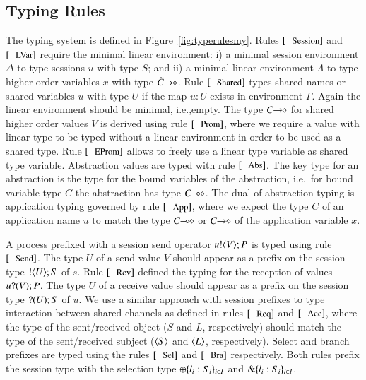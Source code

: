 

\subsection{Typing Rules}



The typing system is defined in Figure~\ref{fig:typerulesmy}.
Rules $\trule{Session}$ and $\trule{LVar}$ require
the minimal linear environment: i) a minimal session environment
$\Delta$ to type sessions $u$ with type $S$; and ii)
a minimal linear environment $\Lambda$ to type 
higher order variables $x$ with type $\tilde{C}\!\! \rightarrow\!\! \diamond$.
Rule $\trule{Shared}$
types shared names or shared variables $u$ with
type $U$ if the map $u:U$ exists in environment
$\Gamma$. Again the linear environment should
be minimal, i.e.,empty.
The type $C\!\! \rightarrow\!\! \diamond$ for shared higher order values $V$
is derived using rule $\trule{Prom}$, where we require
a value with linear type to be typed without a linear
environment in order to be used as a shared type.
Rule $\trule{EProm}$ allows to freely use a linear
type variable as shared type variable. 
Abstraction values are typed with rule $\trule{Abs}$.
The key type for an abstraction is the type for
the bound variables of the abstraction, i.e.~for
bound variable type $C$ the abstraction
has type $C\!\! \multimap\!\! \diamond$.
The dual of abstraction typing is application typing
governed by rule $\trule{App}$, where we expect
the type $C$ of an application name $u$ 
to match the type $C\!\! \multimap\!\! \diamond$ or $C\!\! \rightarrow\!\! \diamond$
of the application variable $x$.

A process prefixed with a session send operator $u ! \langle V \rangle ; P$
is typed using rule $\trule{Send}$.
The type $U$ of a send value $V$ should appear as a prefix
on the session type $! \langle U \rangle ; S$ of $s$.
Rule $\trule{Rcv}$
defined the typing for the 
reception of values $u ? (V) ; P$.
The type $U$ of a receive value should 
appear as a prefix on the session type $? (U) ; S$ of $u$.
We use a similar approach with session prefixes
to type interaction between shared channels as defined 
in rules $\trule{Req}$ and $\trule{Acc}$,
where the type of the sent/received object 
($S$ and $L$, respectively) should
match the type of the sent/received subject
($\langle S \rangle$ and $\langle L \rangle$, respectively).
Select and branch prefixes are typed using the rules
$\trule{Sel}$ and $\trule{Bra}$ respectively. Both
rules prefix the session type with the selection
type $\oplus \{l_i: S_i\}_{i \in I}$ and
$\& \{l_i:S_i\}_{i \in I}$.

